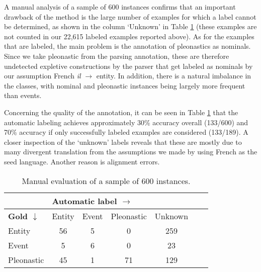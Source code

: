 \documentclass[10pt, a4paper]{article}
\begin{document}
A manual analysis of a sample of 600 instances confirms that an important drawback of  
the method is the large number of examples for which a label cannot be determined, 
as shown in the column `Unknown' in Table \ref{tab:manualsample600} (these examples are not counted in our 22,615 labeled examples reported above). 
As for the examples that are labeled, the main 
problem is the annotation of pleonastics as nominals. Since we take pleonastic 
from the parsing annotation, these are therefore undetected expletive constructions by the parser that get labeled as nominals by our assumption French \textit{il} $\rightarrow$ entity. In addition, 
there is a natural imbalance in the classes, with 
nominal and pleonastic instances being largely more frequent than events.  

Concerning the quality of the annotation, it can
be seen in Table \ref{tab:manualsample600} that the automatic labeling achieves 
approximately 30\% accuracy overall (133/600) and 70\% accuracy if only successfully labeled  
examples are considered (133/189). A closer 
inspection of the `unknown' labels reveals that these are mostly due to many 
divergent translation from the assumptions we made by using French as the seed 
language. Another reason is alignment errors. 


\begin{table}[h!]\centering 
\begin{tabular}{p{1.3cm}|cccccc} 
&\multicolumn{4}{l}{\textbf{Automatic label $\rightarrow$}}\\
\toprule 
{\textbf{Gold $\downarrow$}}&Entity & Event &Pleonastic & Unknown \\ 
\midrule Entity &   56  &  5   &   0     &  259  \\ 
Event &    5  &  6   &  0  &  23\\ 
Pleonastic& 45 & 1&  71&  129\\
\bottomrule 
\end{tabular} \caption{Manual evaluation of a sample of 600
instances.}\label{tab:manualsample600} 
\end{table}

%
%
%
%
\end{document}
